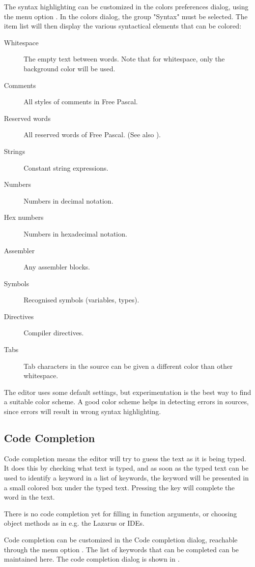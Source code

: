 The syntax highlighting can be customized in the colors preferences dialog,
using the menu option . In the colors dialog, the
group "Syntax" must be selected. The item list will then display the
various syntactical elements that can be colored:
\begin{description}
\item[Whitespace] The empty text between words. Note that for whitespace,
only the background color will be used.
\item[Comments] All styles of comments in Free Pascal.
\item[Reserved words] All reserved words of Free Pascal. (See also ).
\item[Strings] Constant string expressions.
\item[Numbers] Numbers in decimal notation.
\item[Hex numbers] Numbers in hexadecimal notation.
\item[Assembler] Any assembler blocks.
\item[Symbols] Recognised symbols (variables, types).
\item[Directives] Compiler directives.
\item[Tabs] Tab characters in the source can be given a different color than
other whitespace.
\end{description}
The editor uses some default settings, but experimentation is the best way
to find a suitable color scheme. A good color scheme helps in detecting errors
in sources, since errors will result in wrong syntax highlighting.

\subsection{Code Completion}
\label{se:codecompletion}
Code completion means the editor will try to guess the text as it
is being typed. It does this by checking what text is typed, and as soon
as the typed text can be used to identify a keyword in a list of keywords,
the keyword will be presented in a small colored box under the typed text.
Pressing the  key will complete the word in the text.

There is no code completion yet for filling in function arguments, or choosing
object methods as in e.g. the Lazarus or \delphi IDEs.

Code completion can be customized in the Code completion dialog, reachable
through the menu option .
The list of keywords that can be completed can be maintained here.
The code completion dialog is shown in .

